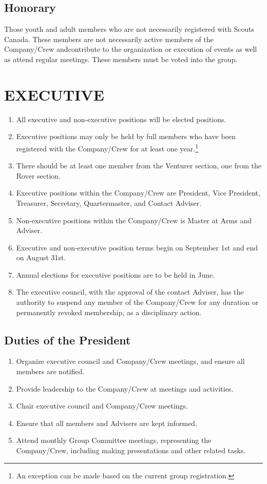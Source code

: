 \documentclass{Service_Corps_Document}
\begin{document}
\subsection{Honorary}
Those youth and adult members who are not necessarily registered with Scouts Canada. These members are not necessarily active members of the Company/Crew andcontribute to the organization or execution of events as well as attend regular meetings. These members must be voted into the group.
\section{EXECUTIVE}
\begin{enumerate}
	\item All executive and non-executive positions will be elected positions.
	\item Executive positions may only be held by full members who have been registered with the Company/Crew for at least one year.\footnote{An exception can be made based on the current group registration.}
	\item There should be at least one member from the Venturer section, one from the Rover section. \footnotemark[\value{footnote}]
	\item Executive positions within the Company/Crew are President, Vice President, Treasurer, Secretary, Quartermaster, and Contact Adviser.
	\item Non-executive positions within the Company/Crew is Master at Arms and Adviser. 
	\item Executive and non-executive position terms begin on September 1st and end on August 31st.
	\item Annual elections for executive positions are to be held in June.
	\item The executive council, with the approval of the contact Adviser, has the authority to suspend any member of the Company/Crew for any duration or permanently revoked membership, as a disciplinary action.
\end{enumerate}
\subsection{Duties of the President}
\begin{enumerate}
	\item Organize executive council and Company/Crew meetings, and ensure all members are notified.
	\item Provide leadership to the Company/Crew at meetings and activities. 
	\item Chair executive council and Company/Crew meetings.
	\item Ensure that all members and Advisers are kept informed.
	\item Attend monthly Group Committee meetings, representing the Company/Crew, including making presentations and other related tasks.
\end{enumerate}
\end{document}
